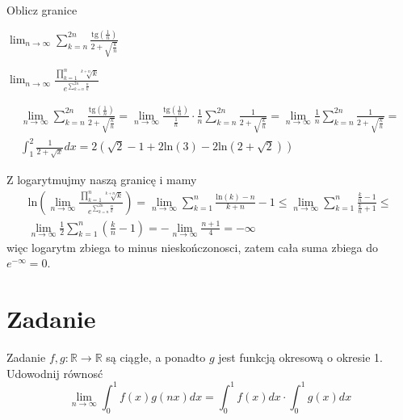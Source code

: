 \documentclass[11pt]{scrartcl}
\begin{document}
          \begin{zadanie}
              Oblicz granice
              \begin{walk}
                  \item $\lim_{n \to \infty } \sum_{k=n}^{2n} \frac{\text{tg} \left ( \frac{1}{n} \right ) }{2 + \sqrt{\frac{k}{n}} }  $
                  \item $\lim_{n \to \infty } \frac{\prod_{k=1}^{n} \sqrt[k+n]{k}   }{e^{\sum_{k=n}^{2n} \frac{n}{k} }} $
              \end{walk}
            
          \end{zadanie}

          \begin{walk}
          \item 
            \begin{gather*}
              \lim_{n \to \infty } \sum_{k = n}^{2n} \frac{\text{tg} \left ( \frac{1}{n} \right ) }{2 + \sqrt{\frac{k}{n}}} = \lim_{n \to \infty } \frac{\text{tg} \left ( \frac{1}{n} \right ) }{\frac{1}{n}} \cdot \frac{1}{n} \sum_{k=n}^{2n} \frac{1}{2 + \sqrt{\frac{k}{n}} } = \lim_{n \to \infty } \frac{1}{n} \sum_{k=n}^{2n} \frac{1}{2 + \sqrt{\frac{k}{n}} } = \\ \int_1^2 \frac{1}{2 + \sqrt{x} } dx = 2 \left ( \sqrt{2} - 1 + 2 \text{ln} \left ( 3 \right ) - 2 \text{ln} \left ( 2 + \sqrt{2}  \right )   \right )
            \end{gather*}
          \item Z logarytmujmy naszą granicę i mamy
            \begin{gather*}
              \text{ln} \left ( \lim_{n \to \infty } \frac{\prod_{k=1}^{n} \sqrt[k+n]{k}   }{e^{\sum_{k=n}^{2n} \frac{n}{k} }}    \right ) = \lim_{n \to \infty } \sum_{k=1}^{n} \frac{\text{ln} \left ( k \right )  - n}{k + n} - 1 \leq \lim_{n \to \infty }   \sum_{k=1}^{n} \frac{\frac{k}{n} - 1}{\frac{k}{n} + 1} \leq \\ \lim_{n \to \infty }   \frac{1}{2} \sum_{k=1}^{n} \left ( \frac{k}{n} - 1 \right ) = - \lim_{n \to \infty }   \frac{n+1}{4} = - \infty 
            \end{gather*}
            więc logarytm zbiega to minus nieskończonosci, zatem cała suma zbiega do $e^{-\infty } = 0$. 
          \end{walk}
          
        
      \section{Zadanie}
          \begin{zadanie}
              Zadanie $f,g : \mathbb{R} \to \mathbb{R} $ są ciągłe, a ponadto $g$ jest funkcją okresową o okresie 1. Udowodnij równosć
              \[
                  \lim_{n \to \infty } \int_0^1 f(x) g(nx)dx = \int_0^1 f(x) dx \cdot \int_0^1 g(x) dx 
              \]
              
          \end{zadanie}
\end{document}
